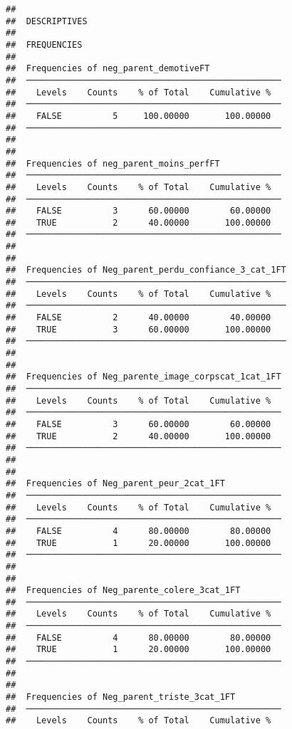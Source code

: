 \documentclass[
]{article}
\begin{document}
\begin{verbatim}
## 
##  DESCRIPTIVES
## 
##  FREQUENCIES
## 
##  Frequencies of neg_parent_demotiveFT               
##  ────────────────────────────────────────────────── 
##    Levels    Counts    % of Total    Cumulative %   
##  ────────────────────────────────────────────────── 
##    FALSE          5     100.00000       100.00000   
##  ────────────────────────────────────────────────── 
## 
## 
##  Frequencies of neg_parent_moins_perfFT             
##  ────────────────────────────────────────────────── 
##    Levels    Counts    % of Total    Cumulative %   
##  ────────────────────────────────────────────────── 
##    FALSE          3      60.00000        60.00000   
##    TRUE           2      40.00000       100.00000   
##  ────────────────────────────────────────────────── 
## 
## 
##  Frequencies of Neg_parent_perdu_confiance_3_cat_1FT 
##  ─────────────────────────────────────────────────── 
##    Levels    Counts    % of Total    Cumulative %   
##  ─────────────────────────────────────────────────── 
##    FALSE          2      40.00000        40.00000   
##    TRUE           3      60.00000       100.00000   
##  ─────────────────────────────────────────────────── 
## 
## 
##  Frequencies of Neg_parente_image_corpscat_1cat_1FT 
##  ────────────────────────────────────────────────── 
##    Levels    Counts    % of Total    Cumulative %   
##  ────────────────────────────────────────────────── 
##    FALSE          3      60.00000        60.00000   
##    TRUE           2      40.00000       100.00000   
##  ────────────────────────────────────────────────── 
## 
## 
##  Frequencies of Neg_parent_peur_2cat_1FT            
##  ────────────────────────────────────────────────── 
##    Levels    Counts    % of Total    Cumulative %   
##  ────────────────────────────────────────────────── 
##    FALSE          4      80.00000        80.00000   
##    TRUE           1      20.00000       100.00000   
##  ────────────────────────────────────────────────── 
## 
## 
##  Frequencies of Neg_parente_colere_3cat_1FT         
##  ────────────────────────────────────────────────── 
##    Levels    Counts    % of Total    Cumulative %   
##  ────────────────────────────────────────────────── 
##    FALSE          4      80.00000        80.00000   
##    TRUE           1      20.00000       100.00000   
##  ────────────────────────────────────────────────── 
## 
## 
##  Frequencies of Neg_parent_triste_3cat_1FT          
##  ────────────────────────────────────────────────── 
##    Levels    Counts    % of Total    Cumulative %   

\end{verbatim}
\end{document}

